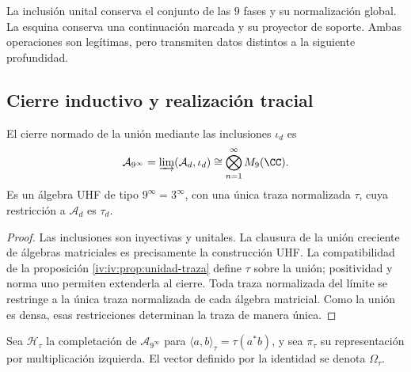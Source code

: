 La inclusión unital conserva el conjunto de las \(9\) fases y su
normalización global. La esquina conserva una continuación marcada y
su proyector de soporte. Ambas operaciones son legítimas, pero
transmiten datos distintos a la siguiente profundidad.

\subsection{Cierre inductivo y realización tracial}

\begin{theorem}
\label{iv:iv:thm:uhf}
El cierre normado de la unión mediante las inclusiones \(\iota_d\)
es
\[
 \mathcal A_{9^\infty}
 =\varinjlim(\mathcal A_d,\iota_d)
 \cong\bigotimes_{n=1}^{\infty}M_9(\CC).
\]
Es un álgebra UHF de tipo \(9^\infty=3^\infty\), con una única
traza normalizada \(\tau\), cuya restricción a \(\mathcal A_d\)
es \(\tau_d\).
\end{theorem}
\begin{proof}
Las inclusiones son inyectivas y unitales. La clausura de la unión
creciente de álgebras matriciales es precisamente la construcción UHF.
La compatibilidad de la proposición \ref{iv:iv:prop:unidad-traza}
define \(\tau\) sobre la unión; positividad y norma uno permiten
extenderla al cierre. Toda traza normalizada del límite se restringe
a la única traza normalizada de cada álgebra matricial. Como la unión
es densa, esas restricciones determinan la traza de manera única.
\end{proof}

Sea \(\mathcal H_\tau\) la completación de
\(\mathcal A_{9^\infty}\) para
\(\langle a,b\rangle_\tau=\tau(a^*b)\), y sea \(\pi_\tau\)
su representación por multiplicación izquierda. El vector definido
por la identidad se denota \(\Omega_\tau\).


